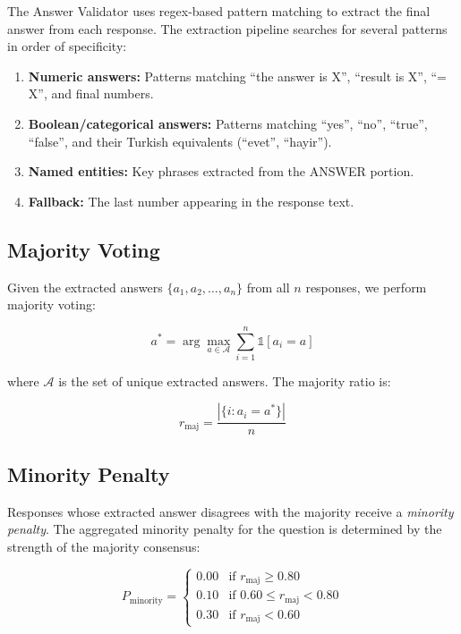 The Answer Validator uses regex-based pattern matching to extract the final answer from each response. The extraction pipeline searches for several patterns in order of specificity:

\begin{enumerate}
    \item \textbf{Numeric answers:} Patterns matching ``the answer is X'', ``result is X'', ``= X'', and final numbers.
    \item \textbf{Boolean/categorical answers:} Patterns matching ``yes'', ``no'', ``true'', ``false'', and their Turkish equivalents (``evet'', ``hayir'').
    \item \textbf{Named entities:} Key phrases extracted from the ANSWER portion.
    \item \textbf{Fallback:} The last number appearing in the response text.
\end{enumerate}

\subsection{Majority Voting}

Given the extracted answers $\{a_1, a_2, \ldots, a_n\}$ from all $n$ responses, we perform majority voting:

\begin{equation}
    a^* = \arg\max_{a \in \mathcal{A}} \sum_{i=1}^{n} \mathbb{1}[a_i = a]
\end{equation}

\noindent
where $\mathcal{A}$ is the set of unique extracted answers. The majority ratio is:

\begin{equation}
    r_{\text{maj}} = \frac{|\{i : a_i = a^*\}|}{n}
\end{equation}

\subsection{Minority Penalty}

Responses whose extracted answer disagrees with the majority receive a \emph{minority penalty}. The aggregated minority penalty for the question is determined by the strength of the majority consensus:

\begin{equation}
    P_{\text{minority}} = \begin{cases}
        0.00 & \text{if } r_{\text{maj}} \geq 0.80 \\
        0.10 & \text{if } 0.60 \leq r_{\text{maj}} < 0.80 \\
        0.30 & \text{if } r_{\text{maj}} < 0.60
    \end{cases}
    \label{eq:minority_penalty}
\end{equation}

